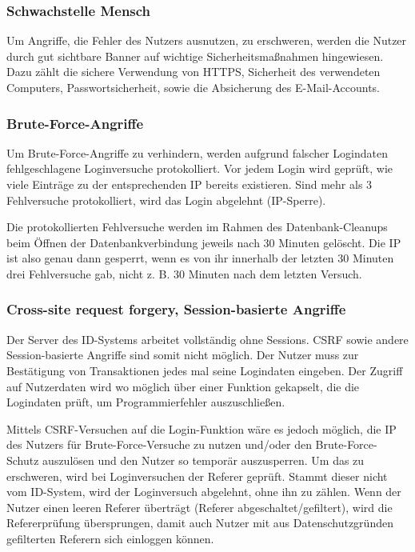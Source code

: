 \documentclass[parskip=half]{scrartcl}
\begin{document}
\subsubsection{Schwachstelle Mensch}
Um Angriffe, die Fehler des Nutzers ausnutzen, zu erschweren, werden die Nutzer durch gut sichtbare Banner auf wichtige Sicherheitsmaßnahmen hingewiesen.
Dazu zählt die sichere Verwendung von HTTPS, Sicherheit des verwendeten Computers, Passwortsicherheit, sowie die Absicherung des E-Mail-Accounts.

\subsubsection{Brute-Force-Angriffe}
Um Brute-Force-Angriffe zu verhindern, werden aufgrund falscher Logindaten fehlgeschlagene Loginversuche protokolliert.
Vor jedem Login wird geprüft, wie viele Einträge zu der entsprechenden IP bereits existieren.
Sind mehr als 3 Fehlversuche protokolliert, wird das Login abgelehnt (IP-Sperre).

Die protokollierten Fehlversuche werden im Rahmen des Datenbank-Cleanups beim Öffnen der Datenbankverbindung jeweils nach 30 Minuten gelöscht.
Die IP ist also genau dann gesperrt, wenn es von ihr innerhalb der letzten 30 Minuten drei Fehlversuche gab,
nicht z. B. 30 Minuten nach dem letzten Versuch.

\subsubsection{Cross-site request forgery, Session-basierte Angriffe}
Der Server des ID-Systems arbeitet vollständig ohne Sessions. CSRF sowie andere Session-basierte Angriffe sind somit nicht möglich.
Der Nutzer muss zur Bestätigung von Transaktionen jedes mal seine Logindaten eingeben.
Der Zugriff auf Nutzerdaten wird wo möglich über einer Funktion gekapselt, die die Logindaten prüft, um Programmierfehler auszuschließen.

Mittels CSRF-Versuchen auf die Login-Funktion wäre es jedoch möglich, die IP des Nutzers für Brute-Force-Versuche zu nutzen
und/oder den Brute-Force-Schutz auszulösen und den Nutzer so temporär auszusperren.
Um das zu erschweren, wird bei Loginversuchen der Referer geprüft.
Stammt dieser nicht vom ID-System, wird der Loginversuch abgelehnt, ohne ihn zu zählen.
Wenn der Nutzer einen leeren Referer überträgt (Referer abgeschaltet/gefiltert), wird die Refererprüfung übersprungen,
damit auch Nutzer mit aus Datenschutzgründen gefilterten Referern sich einloggen können.
\end{document}
